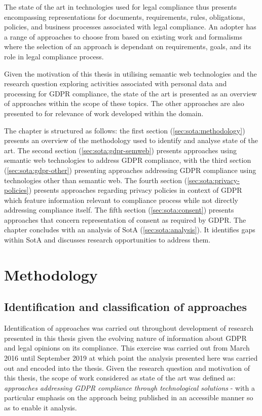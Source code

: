 The state of the art in technologies used for legal compliance thus presents encompassing representations for documents, requirements, rules, obligations, policies, and business processes associated with legal compliance. An adopter has a range of approaches to choose from based on existing work and formalisms where the selection of an approach is dependant on requirements, goals, and its role in legal compliance process.

Given the motivation of this thesis in utilising semantic web technologies and the research question exploring activities associated with personal data and processing for GDPR compliance, the state of the art is presented as an overview of approaches within the scope of these topics.
The other approaches are also presented to for relevance of work developed within the domain.

The chapter is structured as follows: the first section (\autoref{sec:sota:methodology}) presents an overview of the methodology used to identify and analyse state of the art. 
The second section (\autoref{sec:sota:gdpr-semweb}) presents approaches using semantic web technologies to address GDPR compliance, with the third section  (\autoref{sec:sota:gdpr-other}) presenting approaches addressing GDPR compliance using technologies other than semantic web.
The fourth section (\autoref{sec:sota:privacy-policies}) presents approaches regarding privacy policies in context of GDPR which feature information relevant to compliance process while not directly addressing compliance itself.
The fifth section (\autoref{sec:sota:consent}) presents approaches that concern representation of consent as required by GDPR.
The chapter concludes with an analysis of SotA (\autoref{sec:sota:analysis}). It identifies gaps within SotA and discusses research opportunities to address them.

\section{Methodology}\label{sec:sota:methodology}

\subsection{Identification and classification of approaches}
Identification of approaches was carried out throughout development of research presented in this thesis given the evolving nature of information about GDPR and legal opinions on its compliance.
This exercise was carried out from March 2016 until September 2019 at which point the analysis presented here was carried out and encoded into the thesis.
Given the research question and motivation of this thesis, the scope of work considered as state of the art was defined as: \textit{approaches addressing GDPR compliance through technological solutions} - with a particular emphasis on the approach being published in an accessible manner so as to enable it analysis.

